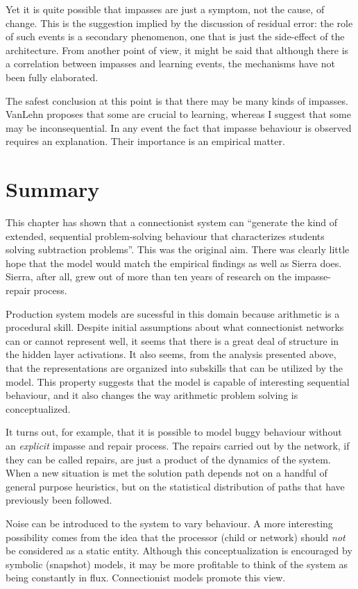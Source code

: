 Yet it is quite possible that impasses are just a symptom, not the cause,
of change.  This is the suggestion implied by the discussion of residual
error: the role of such events is a secondary
phenomenon, one that is just the side-effect of the architecture.
From another point of view, it might be said that although there is a
correlation between impasses and learning events, the mechanisms have not
been fully elaborated.

The safest conclusion at this point is that there may be many kinds of
impasses.  VanLehn proposes that some are crucial to learning, whereas I
suggest that some may be inconsequential.  In any event the fact that
impasse behaviour is observed requires an explanation.  Their importance is
an empirical matter.


\section{Summary}

This chapter has shown that a connectionist system can ``generate the kind
of extended, sequential problem-solving behaviour that characterizes
students solving subtraction problems''.  This was the original aim.  There
was clearly little hope that the model would match the empirical findings
as well as Sierra does.  Sierra, after all, grew out of more than ten
years of research on the impasse-repair process.

Production system models are sucessful in this domain because arithmetic is
a procedural skill. Despite initial assumptions about what connectionist
networks can or cannot represent well, it seems that there is a great deal
of structure in the hidden layer activations.  It also seems, from the
analysis presented above, that the representations are organized into
subskills that can be utilized by the model.  This property suggests that
the model is capable of interesting sequential behaviour, and it also
changes the way arithmetic problem solving is conceptualized.

It turns out, for example, that it is possible to model buggy behaviour
without an {\em explicit\/} impasse and repair process.  The repairs
carried out by
the network, if they can be called repairs, are just a product of the
dynamics of the system.  When a new situation is met the
solution path depends not on a handful of general purpose heuristics, but on
the statistical distribution of paths that have previously been followed.

Noise can be introduced to the system to vary behaviour.  A more
interesting possibility comes
from the idea that the processor (child or network)
should {\em not\/} be considered as a static entity.  Although this
conceptualization is encouraged by symbolic (snapshot) models, it may be
more profitable to think of the system as being constantly in flux.
Connectionist models promote this view.

